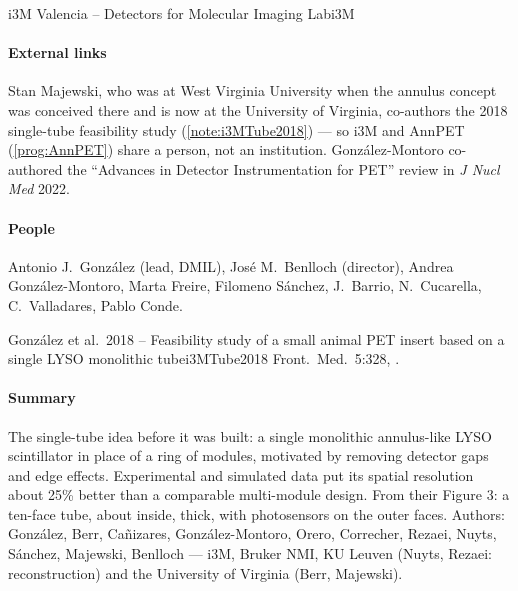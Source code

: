 \begin{programnote}{i3M Valencia -- Detectors for Molecular Imaging Lab}{i3M}
 
\paragraph{External links}
Stan Majewski, who was at West Virginia University when the annulus concept
was conceived there and is now at the University of Virginia, co-authors the
2018 single-tube feasibility study (\ref{note:i3MTube2018}) --- so i3M and
AnnPET (\ref{prog:AnnPET}) share a person, not an institution.
González-Montoro co-authored the ``Advances in Detector Instrumentation for PET''
review in \emph{J Nucl Med} 2022.
 
\paragraph{People}
Antonio J.\ González (lead, DMIL), José M.\ Benlloch (director), Andrea
González-Montoro, Marta Freire, Filomeno Sánchez, J.\ Barrio, N.\ Cucarella,
C.\ Valladares, Pablo Conde.
 
 
\begin{papernote}{González et al.\ 2018 -- Feasibility study of a small animal PET insert based on a single LYSO monolithic tube}{i3MTube2018}
Front.\ Med.\ 5:328, .

\paragraph{Summary}
The single-tube idea before it was built: a single monolithic annulus-like
LYSO scintillator in place of a ring of modules, motivated by removing
detector gaps and edge effects. Experimental and simulated data put its
spatial resolution about 25\% better than a comparable multi-module design.
From their Figure 3: a ten-face tube, about  inside,  thick, with
photosensors on the outer faces.
Authors: González, Berr, Cañizares, González-Montoro, Orero, Correcher,
Rezaei, Nuyts, Sánchez, Majewski, Benlloch --- i3M, Bruker NMI, KU Leuven
(Nuyts, Rezaei: reconstruction) and the University of Virginia (Berr, Majewski).


\end{papernote}
\end{programnote}
